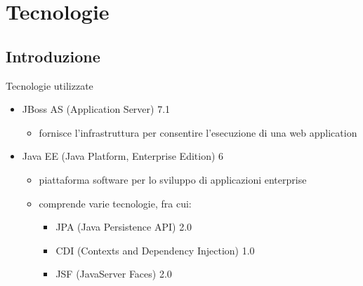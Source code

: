 \section{Tecnologie}

\subsection{Introduzione}

\begin{frame}{Tecnologie utilizzate}

\begin{itemize}
\item JBoss AS (Application Server) 7.1
	\begin{itemize}
	\item fornisce l'infrastruttura per consentire l'esecuzione di una web application
	\end{itemize}

\vspace{1em}

\item Java EE (Java Platform, Enterprise Edition) 6
	\begin{itemize}
	\item piattaforma software per lo sviluppo di applicazioni enterprise
	\item comprende varie tecnologie, fra cui:
		\begin{itemize}
		\item JPA (Java Persistence API) 2.0
		\item CDI (Contexts and Dependency Injection) 1.0
		\item JSF (JavaServer Faces) 2.0
		\end{itemize}
		
	\end{itemize}

\end{itemize}


\end{frame}

